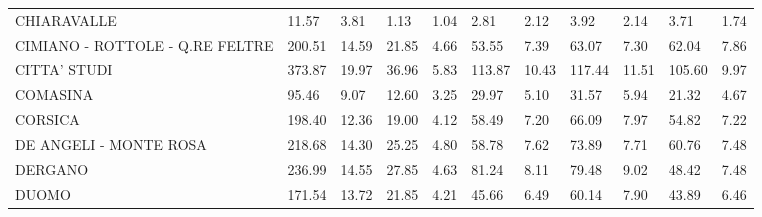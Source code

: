\begin{table}[H]
{{\begin{tabular}{lp{1.3cm}p{1.3cm}p{1.3cm}p{1.3cm}p{1.3cm}p{1.3cm}p{1.3cm}p{1.3cm}p{1.3cm}p{1.3cm}}
CHIARAVALLE                                        &                     11.57 &                  3.81 &                        1.13 &                    1.04 &                        2.81 &                    2.12 &                        3.92 &                    2.14 &                      3.71 &                  1.74 \\
CIMIANO - ROTTOLE - Q.RE FELTRE                    &                    200.51 &                 14.59 &                       21.85 &                    4.66 &                       53.55 &                    7.39 &                       63.07 &                    7.30 &                     62.04 &                  7.86 \\
CITTA' STUDI                                       &                    373.87 &                 19.97 &                       36.96 &                    5.83 &                      113.87 &                   10.43 &                      117.44 &                   11.51 &                    105.60 &                  9.97 \\
COMASINA                                           &                     95.46 &                  9.07 &                       12.60 &                    3.25 &                       29.97 &                    5.10 &                       31.57 &                    5.94 &                     21.32 &                  4.67 \\
CORSICA                                            &                    198.40 &                 12.36 &                       19.00 &                    4.12 &                       58.49 &                    7.20 &                       66.09 &                    7.97 &                     54.82 &                  7.22 \\
DE ANGELI - MONTE ROSA                             &                    218.68 &                 14.30 &                       25.25 &                    4.80 &                       58.78 &                    7.62 &                       73.89 &                    7.71 &                     60.76 &                  7.48 \\
DERGANO                                            &                    236.99 &                 14.55 &                       27.85 &                    4.63 &                       81.24 &                    8.11 &                       79.48 &                    9.02 &                     48.42 &                  7.48 \\
DUOMO                                              &                    171.54 &                 13.72 &                       21.85 &                    4.21 &                       45.66 &                    6.49 &                       60.14 &                    7.90 &                     43.89 &                  6.46 \\

\end{tabular}}}
\end{table}
